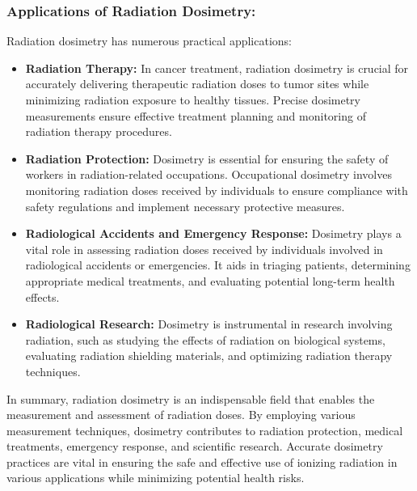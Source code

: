 \documentclass[../introduction.tex]{subfiles}
\begin{document}
    \subsubsection*{\large Applications of Radiation Dosimetry:}
        Radiation dosimetry has numerous practical applications:
        \begin{itemize}
            \item \textbf{Radiation Therapy: } In cancer treatment, radiation dosimetry is crucial for accurately 
            delivering therapeutic radiation doses to tumor sites while minimizing radiation exposure to healthy 
            tissues. Precise dosimetry measurements ensure effective treatment planning and monitoring of radiation 
            therapy procedures.

            \item \textbf{Radiation Protection: } Dosimetry is essential for ensuring the safety of workers in 
            radiation-related occupations. Occupational dosimetry involves monitoring radiation doses received by 
            individuals to ensure compliance with safety regulations and implement necessary protective measures.

            \item \textbf{Radiological Accidents and Emergency Response: } Dosimetry plays a vital role in assessing 
            radiation doses received by individuals involved in radiological accidents or emergencies. It aids in 
            triaging patients, determining appropriate medical treatments, and evaluating potential long-term health 
            effects.

            \item \textbf{Radiological Research: } Dosimetry is instrumental in research involving radiation, such as 
            studying the effects of radiation on biological systems, evaluating radiation shielding materials, and 
            optimizing radiation therapy techniques.

        \end{itemize}
    
        In summary, radiation dosimetry is an indispensable field that enables the measurement and assessment of 
        radiation doses. By employing various measurement techniques, dosimetry contributes to radiation protection, 
        medical treatments, emergency response, and scientific research. Accurate dosimetry practices are vital in 
        ensuring the safe and effective use of ionizing radiation in various applications while minimizing potential 
        health risks.
\end{document}
